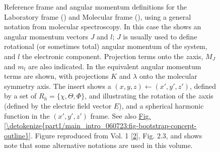 \documentclass[letterpaper,table,10pt,english]{jupyterBook}
\begin{document}
\begin{figure}[htbp]
\centering
\capstart

\noindent{}
\caption{Reference frame and angular momentum definitions for the Laboratory frame ({\hyperref[\detokenize{backmatter/glossary:term-LF}]{}}) and Molecular frame ({\hyperref[\detokenize{backmatter/glossary:term-MF}]{}}), using a general notation from molecular spectroscopy. In this case the {\hyperref[\detokenize{backmatter/glossary:term-LF}]{}} shows an angular momentum vectors \(J\) and \(l\); \(J\) is usually used to define rotational (or sometimes total) angular momentum of the system, and \(l\) the electronic component. Projection terms onto the {\hyperref[\detokenize{backmatter/glossary:term-LF}]{}} \(z\)\sphinxhyphen{}axis, \(M_J\) and \(m_l\) are also indicated. In the {\hyperref[\detokenize{backmatter/glossary:term-MF}]{}} equivalent angular momentum terms are shown, with projections \(K\) and \(\lambda\) onto the molecular symmetry axis. The insert shows a {\hyperref[\detokenize{backmatter/glossary:term-frame-rotation}]{}} \((x,y,z)\leftarrow(x',y',z')\), defined by a set of {\hyperref[\detokenize{backmatter/glossary:term-Euler-angles}]{}} \(R_{\hat{n}}=\{\chi,\Theta,\Phi\}\), and illustrating the rotation of the \(z\)\sphinxhyphen{}axis (defined by the electric field vector \(E\)), and a spherical harmonic function in the \((x',y',z')\) frame. See also \hyperref[\detokenize{part1/main_intro_060723:fig-bootstrap-concept-outline}]{Fig.\@ \ref{\detokenize{part1/main_intro_060723:fig-bootstrap-concept-outline}}}. Figure reproduced from  Vol. 1 {[}\hyperlink{cite.backmatter/bibliography:id663}{2}{]}, Fig. 2.3, and shows  \sphinxhyphen{} note that some alternative notations are used in this volume.}\label{\detokenize{part1/theory_tensor_formalism_160723:fig-frame-defns}}\end{figure}
\end{document}
